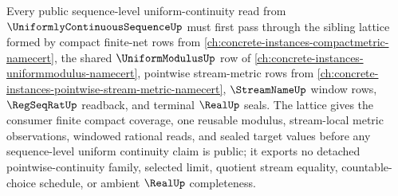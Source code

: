 Every public sequence-level uniform-continuity read from $\UniformlyContinuousSequenceUp$ must first pass through the sibling lattice formed by compact finite-net rows from \autoref{ch:concrete-instances-compactmetric-namecert}, the shared $\UniformModulusUp$ row of \autoref{ch:concrete-instances-uniformmodulus-namecert}, pointwise stream-metric rows from \autoref{ch:concrete-instances-pointwise-stream-metric-namecert}, $\StreamNameUp$ window rows, $\RegSeqRatUp$ readback, and terminal $\RealUp$ seals. The lattice gives the consumer finite compact coverage, one reusable modulus, stream-local metric observations, windowed rational reads, and sealed target values before any sequence-level uniform continuity claim is public; it exports no detached pointwise-continuity family, selected limit, quotient stream equality, countable-choice schedule, or ambient $\RealUp$ completeness.
